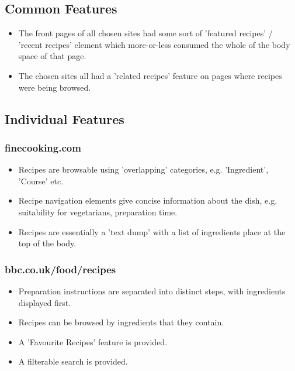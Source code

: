 \documentclass{article}
\begin{document}
\clearpage

\subsection{Common Features}
\begin{itemize}
\item The front pages of all chosen sites had some sort of 'featured recipes' / 'recent recipes' element which more-or-less consumed the whole of the body space of that page. 
\item The chosen sites all had a 'related recipes' feature on pages where recipes were being browsed.
\end{itemize}

\clearpage

\subsection{Individual Features}
\vspace{0.5cm}

\subsubsection{finecooking.com}
\begin{itemize}
\item Recipes are browsable using 'overlapping' categories, e.g. 'Ingredient', 'Course' etc.
\item Recipe navigation elements give concise information about the dish, e.g. suitability for vegetarians, preparation time.
\item Recipes are essentially a 'text dump' with a list of ingredients place at the top of the body.
\end{itemize}

\subsubsection{bbc.co.uk/food/recipes}
\begin{itemize}
\item Preparation instructions are separated into distinct steps, with ingredients displayed first.
\item Recipes can be browsed by ingredients that they contain.
\item A 'Favourite Recipes' feature is provided.
\item A filterable search is provided.
\end{itemize}
\end{document}
